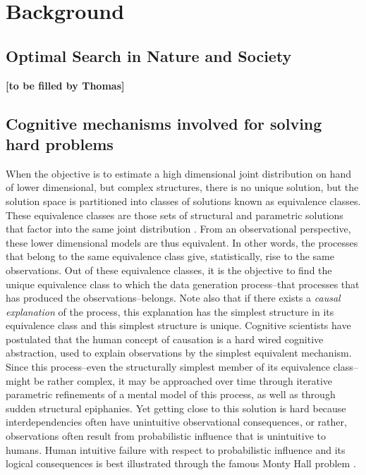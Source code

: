 \section{Background}


\subsection{Optimal Search in Nature and Society}

{\bf [to be filled by Thomas]}

\subsection{Cognitive mechanisms involved for solving hard problems}


When the objective is to estimate a high dimensional joint distribution on hand of lower dimensional, but complex structures, there is no unique solution, but the solution space is partitioned into classes of solutions known as equivalence classes. These equivalence classes are those sets of structural and parametric solutions that factor into the same joint distribution \cite{pearl2009causality, Pearl2009CMR, Koller2009PGM}. From an observational perspective, these lower dimensional models are thus equivalent. In other words, the processes that belong to the same equivalence class give, statistically, rise to the same observations.  Out of these equivalence classes, it is the objective to find the unique equivalence class to which the data generation process--that processes that has produced the observations--belongs. Note also that if there exists a {\it causal explanation} of the process, this explanation has the simplest structure in its equivalence class \cite{Koller2009PGM} and this simplest structure is unique. Cognitive scientists have postulated that the human concept of causation is a hard wired cognitive abstraction, used to explain observations by the simplest equivalent mechanism.  Since this process--even the structurally simplest member of its equivalence class--might be rather complex, it may be approached over time through iterative parametric refinements of a mental model of this process, as well as through sudden structural epiphanies. Yet getting close to this solution is hard because interdependencies often have unintuitive observational consequences, or rather, observations often result from  probabilistic influence that is unintuitive to humans. Human intuitive failure with respect to probabilistic influence and its logical consequences is best illustrated through the famous Monty Hall problem \cite{Blackburn08Phil, Honderich05Phil, Upton14Statistics, Colman08Psych}. \\

